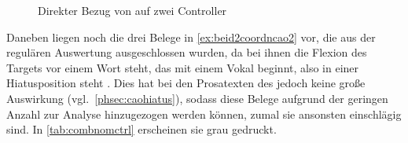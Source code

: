 \begin{figure}
\caption{Direkter Bezug von  auf zwei Controller}
\label{fig:beid2coordncao1_1}
\end{figure}

Daneben liegen noch die drei Belege in \cref{ex:beid2coordncao2} vor, die aus
der regulären Auswertung ausgeschlossen wurden, da bei ihnen die Flexion des
Targets vor einem Wort steht, das mit einem Vokal beginnt, also in einer
Hiatusposition steht \autocites[vgl.][90--91]{askedal1973}[191--193,
201]{gjelsten1980}. Dies hat bei den Prosatexten des \CAO{} jedoch
keine große Auswirkung (vgl.~\cref{phsec:caohiatus}), sodass diese Belege
aufgrund der geringen Anzahl zur Analyse hinzugezogen werden können, zumal sie
ansonsten einschlägig sind. In \cref{tab:combnomctrl} erscheinen sie grau
gedruckt.

